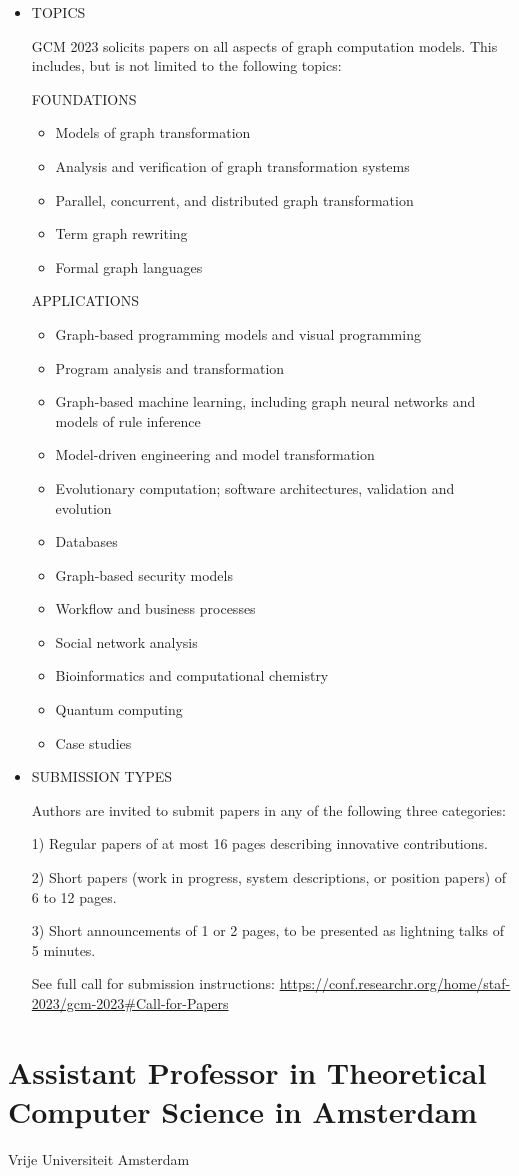 \documentclass[prodmode,acmtecs]{acmsmall} %
\begin{document}
\begin{itemize}
\item  TOPICS 
 
  GCM 2023 solicits papers on all aspects of graph computation models. This includes, but is not limited to the following topics: 
 
  FOUNDATIONS 
 
\begin{itemize}\item  Models of graph transformation
\item  Analysis and verification of graph transformation systems
\item  Parallel, concurrent, and distributed graph transformation
\item  Term graph rewriting
\item  Formal graph languages
\end{itemize} 
  APPLICATIONS 
 
\begin{itemize}\item  Graph-based programming models and visual programming
\item  Program analysis and transformation
\item  Graph-based machine learning, including graph neural networks and models of rule inference
\item  Model-driven engineering and model transformation
\item  Evolutionary computation; software architectures, validation and evolution
\item  Databases
\item  Graph-based security models
\item  Workflow and business processes
\item  Social network analysis
\item  Bioinformatics and computational chemistry
\item  Quantum computing
\item  Case studies
\end{itemize} 
\item  SUBMISSION TYPES 
 
  Authors are invited to submit papers in any of the following three categories: 
 
  1) Regular papers of at most 16 pages describing innovative contributions. 
 
  2) Short papers (work in progress, system descriptions, or position papers) of 6 to 12 pages. 
 
  3) Short announcements of 1 or 2 pages, to be presented as lightning talks of 5 minutes. 
 
  See full call for submission instructions: \href{https://conf.researchr.org/home/staf-2023/gcm-2023#Call-for-Papers}{https://conf.researchr.org/home/staf-2023/gcm-2023\#Call-for-Papers} 
 
\end{itemize}\section{Assistant Professor in Theoretical Computer Science in Amsterdam}\label{AssistantProfessorinTheoreticalComputerScienceinAmsterdam}  Vrije Universiteit Amsterdam\\ 
\end{document}
